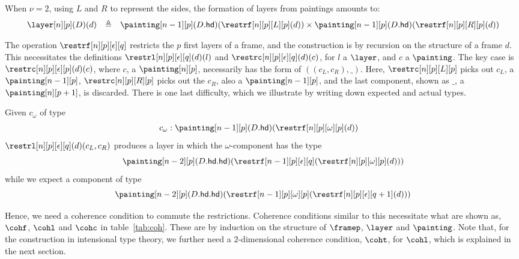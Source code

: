 \documentclass{art.cls/art}
\newcommand{\defeq}{\ensuremath{\triangleq}}
\newcommand{\hd}{\ensuremath{\mathsf{hd}}}
\begin{document}
When $\nu = 2$, using $L$ and $R$ to represent the sides, the formation of layers from paintings amounts to:
\begin{equation*}
  \begin{array}{llc}
    \layer[n][p](D)(d) & \defeq & \painting[n-1][p](D.\hd)(\restrf[n][p][L][p](d)) \times \painting[n-1][p](D.\hd)(\restrf[n][p][R][p](d))
  \end{array}
\end{equation*}

The operation $\restrf[n][p][\epsilon][q]$ restricts the $p$ first layers of a frame, and the construction is by recursion on the structure of a frame $d$. This necessitates the definitions $\restrl[n][p][\epsilon][q](d)(l)$ and $\restrc[n][p][\epsilon][q](d)(c)$, for $l$ a $\layer$, and $c$ a $\painting$. The key case is $\restrc[n][p][\epsilon][p](d)(c)$, where $c$, a $\painting[n][p]$, necessarily has the form of $((c_L, c_R), \_)$. Here, $\restrc[n][p][L][p]$ picks out $c_L$, a $\painting[n-1][p]$, $\restrc[n][p][R][p]$ picks out the $c_R$, also a $\painting[n-1][p]$, and the last component, shown as $\_$, a $\painting[n][p+1]$, is discarded. There is one last difficulty, which we illustrate by writing down expected and actual types.

Given $c_\omega$ of type
\begin{align*}
  c_\omega & : \painting[n-1][p](D.\hd)(\restrf[n][p][\omega][p](d))
\end{align*}
$\restrl[n][p][\epsilon][q](d)(c_L, c_R)$ produces a layer in which the $\omega$-component has the type
\begin{equation*}
  \painting[n-2][p](D.\hd.\hd)(\restrf[n-1][p][\epsilon][q](\restrf[n][p][\omega][p](d)))
\end{equation*}
while we expect a component of type
\begin{equation*}
  \painting[n-2][p](D.\hd.\hd)(\restrf[n-1][p][\omega][p](\restrf[n][p][\epsilon][q+1](d)))
\end{equation*}

Hence, we need a coherence condition to commute the restrictions. Coherence conditions similar to this necessitate what are shown as, $\cohf$, $\cohl$ and $\cohc$ in table~\ref{tab:coh}. These are by induction on the structure of $\framep$, $\layer$ and $\painting$. Note that, for the construction in intensional type theory, we further need a $2$-dimensional coherence condition, $\coht$, for $\cohl$, which is explained in the next section.
\end{document}
